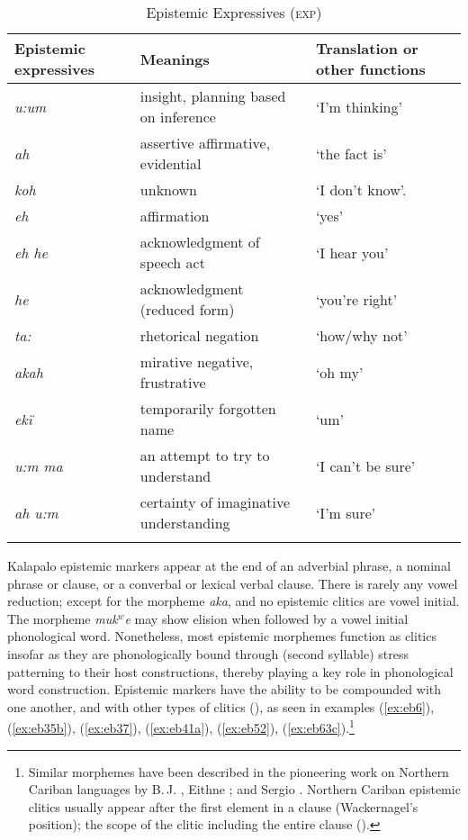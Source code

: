\documentclass[output=paper]{langsci/langscibook}
\begin{document}
\begin{table}[t]
\begin{tabularx}{\textwidth}{lQQ}
\lsptoprule
\textbf{Epistemic expressives} & \textbf{Meanings} & \textbf{Translation or other functions}\\
\midrule
\textit{	u:um	}	&	insight, planning based on inference	&	‘I’m thinking’	\\
\tablevspace
\textit{	ah	}	&	assertive affirmative, evidential	&	‘the fact is’	\\
\tablevspace
\textit{	koh	}	&	unknown	&	‘I don’t know’.	\\
\tablevspace
\textit{	eh	}	&	affirmation	&	‘yes’	\\
\tablevspace
\textit{	eh he	}	&	acknowledgment of speech act	&	‘I hear you’	\\
\tablevspace
\textit{	he	}	&	acknowledgment (reduced form)	&	‘you’re right’	\\
\tablevspace
\textit{	ta:	}	&	rhetorical negation	&	‘how/why not’	\\
\tablevspace
\textit{	akah	}	&	mirative negative, frustrative	&	‘oh my’	\\
\tablevspace
\textit{	ekï	}	&	temporarily forgotten name	&	‘um’	\\
\tablevspace
\textit{	u:m ma	}	&	an attempt to try to understand	&	‘I can’t be sure’	\\
\tablevspace
\textit{	ah u:m	}	&	certainty of imaginative understanding	&	‘I’m sure’	\\
\lspbottomrule
\end{tabularx}
\caption{Epistemic Expressives (\textsc{exp})}
\label{tab:eb2}
\end{table}


Kalapalo epistemic markers appear at the end of an adverbial phrase, a nominal phrase or clause, or a converbal or lexical verbal clause. There is rarely any vowel reduction; except for the morpheme \textit{aka}, and no epistemic clitics are vowel initial.  The morpheme \textit{muk$^w$e} may show elision when followed by a vowel initial phonological word.  Nonetheless, most epistemic morphemes function as clitics insofar as they are phonologically bound through (second syllable) stress patterning to their host constructions, thereby playing a key role in phonological word construction.  Epistemic markers have the ability to be compounded with one another, and with other types of clitics (\citealt{Basso2014}), as seen in examples (\ref{ex:eb6}), (\ref{ex:eb35b}), (\ref{ex:eb37}), (\ref{ex:eb41a}),  (\ref{ex:eb52}), (\ref{ex:eb63c}).\footnote{Similar morphemes have been described in the pioneering work on Northern Cariban languages  by  B.\,J. \cite{Hoff1986}, Eithne \cite{Carlin2004}; and  Sergio \cite{Meira1999}.  Northern  Cariban epistemic clitics usually appear after the first element in a clause (Wackernagel’s position); the scope of the clitic including the entire clause (\citealt{Hoff1986}).}
 
\end{document}
